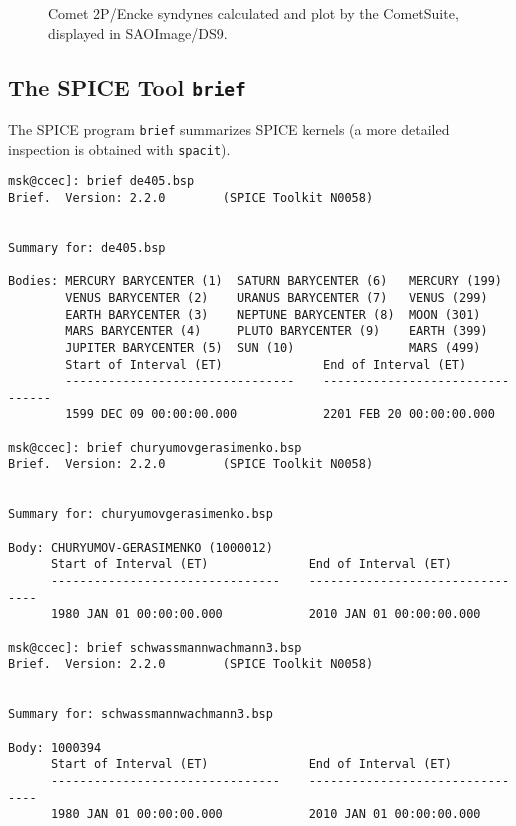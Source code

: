 \documentclass[12pt,letterpaper]{article}
\newcommand\cs{CometSuite}
\begin{document}
\begin{figure}
\center
\caption{Comet 2P/Encke syndynes calculated and plot by the
\cs{}, displayed in SAOImage/DS9. \label{fig:rd-ds9}}
\end{figure}


\subsection{The SPICE Tool \texttt{brief}}
The SPICE program \texttt{brief} summarizes SPICE kernels (a more
detailed inspection is obtained with \texttt{spacit}).
\begin{lstlisting}
msk@ccec]: brief de405.bsp 
Brief.  Version: 2.2.0        (SPICE Toolkit N0058)
 
 
Summary for: de405.bsp
 
Bodies: MERCURY BARYCENTER (1)  SATURN BARYCENTER (6)   MERCURY (199)
        VENUS BARYCENTER (2)    URANUS BARYCENTER (7)   VENUS (299)
        EARTH BARYCENTER (3)    NEPTUNE BARYCENTER (8)  MOON (301)
        MARS BARYCENTER (4)     PLUTO BARYCENTER (9)    EARTH (399)
        JUPITER BARYCENTER (5)  SUN (10)                MARS (499)
        Start of Interval (ET)              End of Interval (ET)
        --------------------------------    --------------------------------
        1599 DEC 09 00:00:00.000            2201 FEB 20 00:00:00.000
 
msk@ccec]: brief churyumovgerasimenko.bsp 
Brief.  Version: 2.2.0        (SPICE Toolkit N0058)
 
 
Summary for: churyumovgerasimenko.bsp
 
Body: CHURYUMOV-GERASIMENKO (1000012)
      Start of Interval (ET)              End of Interval (ET)
      --------------------------------    --------------------------------
      1980 JAN 01 00:00:00.000            2010 JAN 01 00:00:00.000

msk@ccec]: brief schwassmannwachmann3.bsp
Brief.  Version: 2.2.0        (SPICE Toolkit N0058)
 
 
Summary for: schwassmannwachmann3.bsp
 
Body: 1000394
      Start of Interval (ET)              End of Interval (ET)
      --------------------------------    --------------------------------
      1980 JAN 01 00:00:00.000            2010 JAN 01 00:00:00.000
\end{lstlisting}
\end{document}
